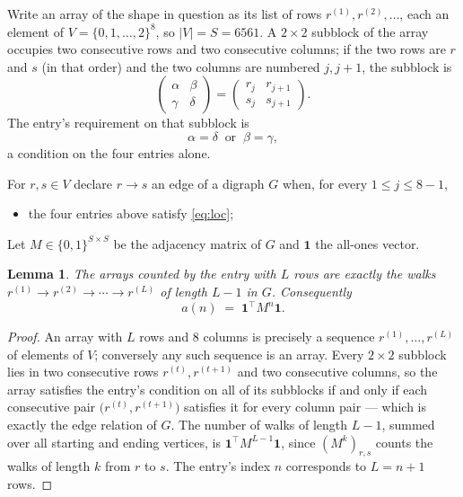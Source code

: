 \documentclass[11pt,a4paper]{article}
\theoremstyle{plain}
\newtheorem{lemma}[theorem]{Lemma}
\theoremstyle{definition}
\begin{document}
Write an array of the shape in question as its list of rows
$r^{(1)},r^{(2)},\dots$, each an element of
$V=\{0,1,\dots,2\}^{8}$, so $|V|=S=6561$. A $2\times2$ subblock of the array
occupies two consecutive rows and two consecutive columns; if the two rows are $r$
and $s$ (in that order) and the two columns are numbered $j,j+1$,
the subblock is
\[
\begin{pmatrix}\alpha&\beta\\\gamma&\delta\end{pmatrix}=\begin{pmatrix}r_j&r_{j+1}\\s_j&s_{j+1}\end{pmatrix}.
\]
The entry's requirement on that subblock is
\begin{equation}\label{eq:loc}
\alpha=\delta\ \text{ or }\ \beta=\gamma,
\end{equation}
a condition on the four entries alone.

For $r,s\in V$ declare $r\to s$ an edge of a digraph $G$ when, for every
$1\le j\le 8-1$,
\begin{itemize}
\item the four entries above satisfy \eqref{eq:loc};

\end{itemize}
Let $M\in\{0,1\}^{S\times S}$ be the adjacency matrix of $G$ and $\mathbf{1}$ the
all-ones vector.

\begin{lemma}\label{lem:walk}
The arrays counted by the entry with $L$ rows are exactly the walks
$r^{(1)}\to r^{(2)}\to\cdots\to r^{(L)}$ of length $L-1$ in $G$. Consequently
\[
a(n)\;=\;\mathbf{1}^{\!\top}M^{n}\mathbf{1} .
\]
\end{lemma}

\begin{proof}
An array with $L$ rows and $8$ columns is precisely a sequence
$r^{(1)},\dots,r^{(L)}$ of elements of $V$; conversely any such sequence is an array.
Every $2\times2$ subblock lies in two consecutive rows $r^{(t)},r^{(t+1)}$ and two
consecutive columns, so the array satisfies the entry's condition on all of its subblocks
if and only if each consecutive pair $\bigl(r^{(t)},r^{(t+1)}\bigr)$ satisfies it for
every column pair --- which is exactly the edge relation of $G$. The number of walks of
length $L-1$, summed over all starting and ending vertices, is
$\mathbf{1}^{\!\top}M^{L-1}\mathbf{1}$, since $(M^{k})_{r,s}$ counts the walks of
length $k$ from $r$ to $s$. The entry's index $n$ corresponds to $L=n+1$ rows.
\end{proof}
\end{document}
